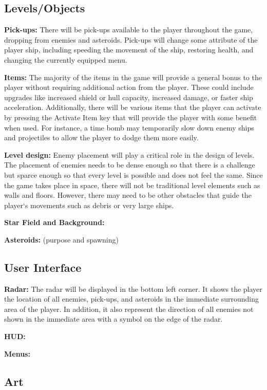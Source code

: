 \documentclass[12pt]{article}       %
\begin{document}
\subsection{Levels/Objects} %

	{\bf Pick-ups:}  There will be pick-ups available to the player throughout the game, dropping from enemies and asteroids. Pick-ups will change some attribute of the player ship, including  speeding the movement of the ship, restoring health, and changing the currently equipped menu.

	{\bf  Items:} The majority of the items in the game will provide a general bonus to the player without requiring additional action from the player. These could include upgrades like increased shield or hull capacity, increased damage, or faster ship acceleration. Additionally, there will be various items that the player can activate by pressing the Activate Item key that will provide the player with some benefit when used. For instance, a time bomb may temporarily slow down enemy ships and projectiles to allow the player to dodge them more easily.

	{\bf Level design:} Enemy placement will play a critical role in the design of levels. The placement of enemies needs to be dense enough so that there is a challenge but  sparce enough so that every level is possible and does not feel the same. Since the game takes place in space, there will not be traditional level elements such as walls and floors. However, there may need to be other obstacles that guide the player‘s movements such as debris or very large ships.

	{\bf Star Field and Background:}

	{\bf Asteroids:} (purpose and spawning)

\subsection{User Interface} %

	{\bf Radar:} The radar will be displayed in the bottom left corner. It shows the player the location of all enemies, pick-ups, and asteroids in the immediate surrounding area of the player. In addition, it also represent the direction of all enemies not shown in the immediate area with a symbol on the edge of the radar.

	{\bf HUD:}

	{\bf Menus:}

\subsection{Art} %
\end{document}
